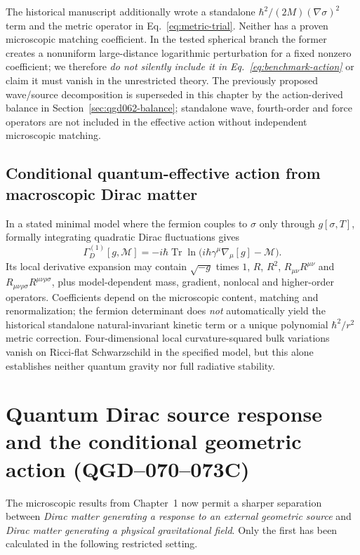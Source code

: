 \documentclass[11pt,a4paper]{article}
\newcommand{\mc}{\mathcal M}
\begin{document}
The historical manuscript additionally wrote a standalone $\hbar^2/(2M)(\nabla\sigma)^2$ term and the metric operator in Eq.~\eqref{eq:metric-trial}. Neither has a proven microscopic matching coefficient. In the tested spherical branch the former creates a nonuniform large-distance logarithmic perturbation for a fixed nonzero coefficient; we therefore \emph{do not silently include it in Eq.~\eqref{eq:benchmark-action}} or claim it must vanish in the unrestricted theory. The previously proposed wave/source decomposition is superseded in this chapter by the action-derived balance in Section~\ref{sec:qgd062-balance}; standalone wave, fourth-order and force operators are not included in the effective action without independent microscopic matching.

\subsection{Conditional quantum-effective action from macroscopic Dirac matter}
In a stated minimal model where the fermion couples to $\sigma$ only through $g[\sigma,T]$, formally integrating quadratic Dirac fluctuations gives
\begin{equation}\label{eq:dirac-det}
\Gamma_D^{(1)}[g,\mc]=-i\hbar\operatorname{Tr}
\ln\bigl(i\hbar\gamma^\mu\nabla_\mu[g]-\mc\bigr).
\end{equation}
Its local derivative expansion may contain $\sqrt{-g}$ times $1$, $R$, $R^2$, $R_{\mu\nu}R^{\mu\nu}$ and $R_{\mu\nu\rho\sigma}R^{\mu\nu\rho\sigma}$, plus model-dependent mass, gradient, nonlocal and higher-order operators. Coefficients depend on the microscopic content, matching and renormalization; the fermion determinant does \emph{not} automatically yield the historical standalone natural-invariant kinetic term or a unique polynomial $\hbar^2/r^2$ metric correction. Four-dimensional local curvature-squared bulk variations vanish on Ricci-flat Schwarzschild in the specified model, but this alone establishes neither quantum gravity nor full radiative stability.


\section{Quantum Dirac source response and the conditional geometric action (QGD--070--073C)}\label{sec:qgd075-induced-geometry}
The microscopic results from Chapter~1 now permit a sharper separation
between \emph{Dirac matter generating a response to an external geometric
source} and \emph{Dirac matter generating a physical gravitational field}.
Only the first has been calculated in the following restricted setting.
\end{document}
